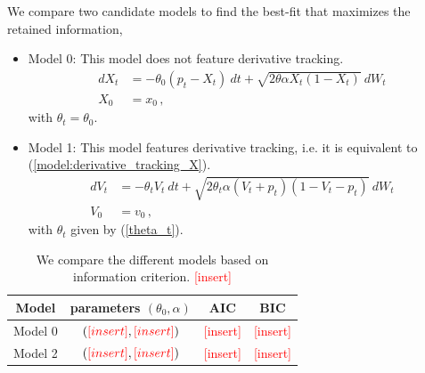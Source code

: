 \documentclass[11pt,english]{article}
\newcommand{\add}{\textcolor{red}{[insert]}}
\begin{document}
We compare two candidate models to find the best-fit that maximizes the retained information,
\begin{itemize}
  \item Model 0: This model does not feature derivative tracking.
  \begin{align}
  dX_t &=  - \theta_0 (p_t-X_t) \  dt + \sqrt{2 \theta \alpha X_t (1-X_t)} \  dW_t   \nonumber \\ %
  X_0 & = x_0 \,, \label{M0}
 \end{align}
  with $\theta_t= \theta_0 $.

%  

  \item Model 1: This model features derivative tracking, i.e. it is equivalent to (\ref{model:derivative_tracking_X}).
  \begin{align}
  dV_t &=  - \theta_t V_t \  dt + \sqrt{2 \theta_t \alpha (V_t +p_t ) (1-V_t-p_t)} \  dW_t   \nonumber \\ %
  V_0 & = v_0 \,, \label{M2}
  \end{align}
  with $\theta_t$ given by (\ref{theta_t}).
\end{itemize}

\begin{table}
\centering
\begin{tabular}{|c|c|c|c|}
\hline
Model   &  parameters $(\theta_0, \alpha)$   & AIC & BIC \\ \hline
Model 0 &  $(\add,\add) $    &  \add   &  \add   \\ \hline
Model 2 &   $(\add,\add)$   &  \add   &   \add    \\ \hline
\end{tabular}
\caption{We compare the different models based on information criterion. \add }
\label{tab:model_comparison}
\end{table}
\end{document}
